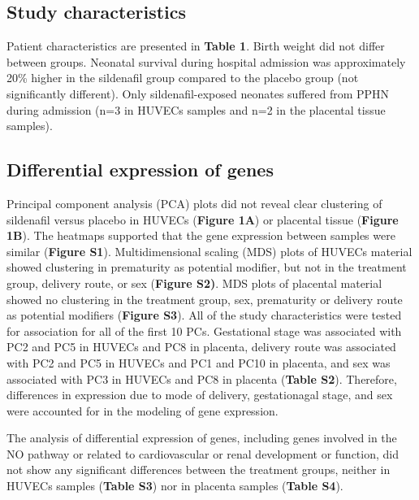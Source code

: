 \documentclass[authordate, empirical]{jote-new-article}
\begin{document}
	\subsection{Study characteristics }



	Patient characteristics are presented in \textbf{Table 1}. Birth weight did not differ between groups. Neonatal survival during hospital admission was approximately 20\% higher in the sildenafil group compared to the placebo group (not significantly different). Only sildenafil-exposed neonates suffered from PPHN during admission (n=3 in HUVECs samples and n=2 in the placental tissue samples).







	\subsection{Differential expression of genes }



	Principal component analysis (PCA) plots did not reveal clear clustering of sildenafil versus placebo in HUVECs (\textbf{Figure 1A}) or placental tissue (\textbf{Figure 1B}). The heatmaps supported that the gene expression between samples were similar (\textbf{Figure S1}). Multidimensional scaling (MDS) plots of HUVECs material showed clustering in prematurity as potential modifier, but not in the treatment group, delivery route, or sex (\textbf{Figure S2)}. MDS plots of placental material showed no clustering in the treatment group, sex, prematurity or delivery route as potential modifiers (\textbf{Figure S3}). All of the study characteristics were tested for association for all of the first 10 PCs. Gestational stage was associated with PC2 and PC5 in HUVECs and PC8 in placenta, delivery route was associated with PC2 and PC5 in HUVECs and PC1 and PC10 in placenta, and sex was associated with PC3 in HUVECs and PC8 in placenta (\textbf{Table S2}). Therefore, differences in expression due to mode of delivery, gestationagal stage, and sex were accounted for in the modeling of gene expression.



	The analysis of differential expression of genes, including genes involved in the NO pathway or related to cardiovascular or renal development or function, did not show any significant differences between the treatment groups, neither in HUVECs samples (\textbf{Table S3}) nor in placenta samples (\textbf{Table S4}).
\end{document}
